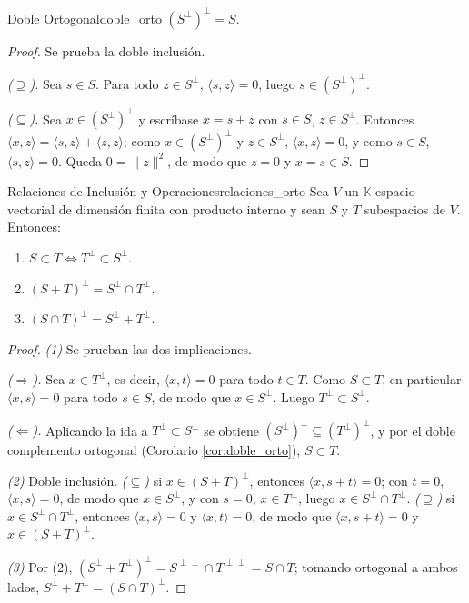 \documentclass[11pt, a4paper]{article}
\begin{document}
\begin{corolario}{Doble Ortogonal}{doble_orto}
$(S^\perp)^\perp = S$.
\end{corolario}

\begin{proof}
Se prueba la doble inclusión.

\textit{($\supseteq$).} Sea $s \in S$. Para todo $z \in S^\perp$, $\langle s, z \rangle = 0$, luego $s \in (S^\perp)^\perp$.

\textit{($\subseteq$).} Sea $x \in (S^\perp)^\perp$ y escríbase $x = s + z$ con $s \in S$, $z \in S^\perp$. Entonces $\langle x, z \rangle = \langle s, z \rangle + \langle z, z \rangle$; como $x \in (S^\perp)^\perp$ y $z \in S^\perp$, $\langle x, z \rangle = 0$, y como $s \in S$, $\langle s, z \rangle = 0$. Queda $0 = \|z\|^2$, de modo que $z = 0$ y $x = s \in S$.
\end{proof}

\begin{proposicion}{Relaciones de Inclusión y Operaciones}{relaciones_orto}
Sea $V$ un $\mathbb{K}$-espacio vectorial de dimensión finita con producto interno y sean $S$ y $T$ subespacios de $V$. Entonces:
\begin{enumerate}
    \item $S \subset T \iff T^\perp \subset S^\perp$.
    \item $(S+T)^\perp = S^\perp \cap T^\perp$.
    \item $(S \cap T)^\perp = S^\perp + T^\perp$.
\end{enumerate}
\end{proposicion}

\begin{proof}
\textit{(1)} Se prueban las dos implicaciones.

\textit{($\Rightarrow$).} Sea $x \in T^\perp$, es decir, $\langle x, t \rangle = 0$ para todo $t \in T$. Como $S \subset T$, en particular $\langle x, s \rangle = 0$ para todo $s \in S$, de modo que $x \in S^\perp$. Luego $T^\perp \subset S^\perp$.

\textit{($\Leftarrow$).} Aplicando la ida a $T^\perp \subset S^\perp$ se obtiene $(S^\perp)^\perp \subseteq (T^\perp)^\perp$, y por el doble complemento ortogonal (Corolario \ref{cor:doble_orto}), $S \subset T$.

\textit{(2)} Doble inclusión. \textit{($\subseteq$)} si $x \in (S+T)^\perp$, entonces $\langle x, s+t \rangle = 0$; con $t=0$, $\langle x, s \rangle = 0$, de modo que $x \in S^\perp$, y con $s=0$, $x \in T^\perp$, luego $x \in S^\perp \cap T^\perp$. \textit{($\supseteq$)} si $x \in S^\perp \cap T^\perp$, entonces $\langle x, s \rangle = 0$ y $\langle x, t \rangle = 0$, de modo que $\langle x, s+t \rangle = 0$ y $x \in (S+T)^\perp$.

\textit{(3)} Por (2), $(S^\perp + T^\perp)^\perp = S^{\perp\perp} \cap T^{\perp\perp} = S \cap T$; tomando ortogonal a ambos lados, $S^\perp + T^\perp = (S \cap T)^\perp$.
\end{proof}
\end{document}
